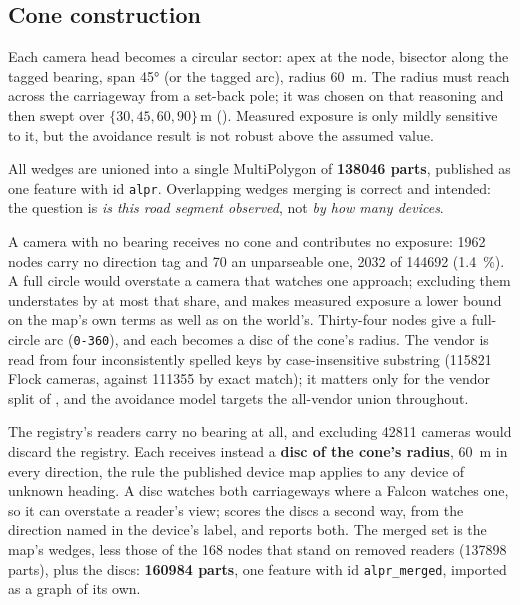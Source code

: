 \documentclass[11pt,twoside]{article}
\begin{document}
\subsection{Cone construction}
\label{sec:data:cones}

Each camera head becomes a circular sector: apex at the node, bisector along the tagged
bearing, span \ang{45} (or the tagged arc), radius \SI{60}{\metre}. The radius must reach
across the carriageway from a set-back pole; it was chosen on that reasoning and then swept
over $\{30,45,60,90\}\,\si{\metre}$ (). Measured exposure is only mildly
sensitive to it, but the avoidance result is not robust above the assumed value.

All wedges are unioned into a single MultiPolygon of \textbf{\num{138046} parts},
published as one feature with id \texttt{alpr}. Overlapping wedges merging is correct and
intended: the question is \emph{is this road segment observed}, not \emph{by how many
devices}.

A camera with no bearing receives no cone and contributes no exposure: \num{1962} nodes carry
no direction tag and 70 an unparseable one, \num{2032} of \num{144692} (\SI{1.4}{\percent}).
A full circle would overstate a camera that watches one approach; excluding them understates
by at most that share, and makes measured exposure a lower bound on the map's own terms as
well as on the world's. Thirty-four nodes give a full-circle arc (\texttt{0-360}), and each
becomes a disc of the cone's radius. The
vendor is read from four inconsistently spelled keys by case-insensitive substring
(\num{115821} Flock cameras, against \num{111355} by exact match); it matters only for the
vendor split of , and the avoidance model targets the all-vendor
union throughout.

The registry's readers carry no bearing at all, and excluding \num{42811} cameras would
discard the registry. Each receives instead a \textbf{disc of the cone's radius},
\SI{60}{\metre} in every direction, the rule the published device map applies to any device
of unknown heading. A disc watches both carriageways where a Falcon watches one, so it can
overstate a reader's view;  scores the discs a second way, from the
direction named in the device's label, and  reports both. The
merged set is the map's wedges, less those of the 168 nodes that stand on removed readers
(\num{137898} parts), plus the discs: \textbf{\num{160984} parts}, one feature with id
\texttt{alpr\_merged}, imported as a graph of its own.
\end{document}
